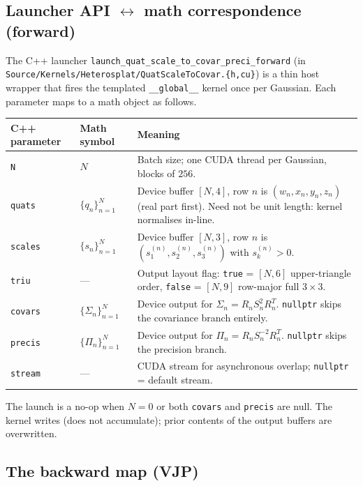 \documentclass[11pt]{article}
\begin{document}
\subsection{Launcher API \texorpdfstring{$\leftrightarrow$}{<->} math correspondence (forward)}
\label{sec:qsc-fwd-api}

The C++ launcher
\texttt{launch\_quat\_scale\_to\_covar\_preci\_forward} (in
\texttt{Source/Kernels/Heterosplat/QuatScaleToCovar.\{h,cu\}}) is a thin
host wrapper that fires the templated \texttt{\_\_global\_\_} kernel
once per Gaussian. Each parameter maps to a math object as follows.

\begin{center}
\begin{tabular}{l l p{8.0cm}}
\hline
\textbf{C++ parameter} & \textbf{Math symbol} & \textbf{Meaning} \\
\hline
\texttt{N} & $N$ &
Batch size; one CUDA thread per Gaussian, blocks of $256$. \\
\texttt{quats} & $\{q_n\}_{n=1}^{N}$ &
Device buffer $[N, 4]$, row $n$ is $(w_n, x_n, y_n, z_n)$ (real part first).
Need not be unit length: kernel normalises in-line. \\
\texttt{scales} & $\{s_n\}_{n=1}^{N}$ &
Device buffer $[N, 3]$, row $n$ is $(s_1^{(n)}, s_2^{(n)}, s_3^{(n)})$
with $s_k^{(n)} > 0$. \\
\texttt{triu} & --- &
Output layout flag: \texttt{true} = $[N,6]$ upper-triangle order,
\texttt{false} = $[N,9]$ row-major full $3 \times 3$. \\
\texttt{covars} & $\{\Sigma_n\}_{n=1}^{N}$ &
Device output for $\Sigma_n = R_n S_n^{2} R_n^T$. \texttt{nullptr}
skips the covariance branch entirely. \\
\texttt{precis} & $\{\Pi_n\}_{n=1}^{N}$ &
Device output for $\Pi_n = R_n S_n^{-2} R_n^T$. \texttt{nullptr}
skips the precision branch. \\
\texttt{stream} & --- &
CUDA stream for asynchronous overlap; \texttt{nullptr} = default stream. \\
\hline
\end{tabular}
\end{center}

\noindent
The launch is a no-op when $N = 0$ or both \texttt{covars} and
\texttt{precis} are null. The kernel writes (does not accumulate);
prior contents of the output buffers are overwritten.

\subsection{The backward map (VJP)}
\label{sec:qsc-bwd}
\end{document}
